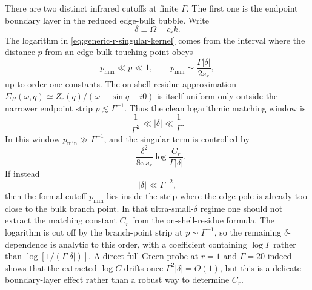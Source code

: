 \documentclass[aps,prx,preprint,amsmath,amssymb]{revtex4-2}
\begin{document}
There are two distinct infrared cutoffs at finite \(\Gamma\).  The first one is
the endpoint boundary layer in the reduced edge-bulk bubble.  Write
\[
\delta\equiv \Omega-c_r k.
\]
The logarithm in \eqref{eq:generic-r-singular-kernel} comes from the interval
where the distance \(p\) from an edge-bulk touching point obeys
\[
p_{\min}\ll p\ll1,
\qquad
p_{\min}\sim \frac{\Gamma|\delta|}{2s_r},
\]
up to order-one constants.  The on-shell residue approximation
\(\Sigma_R(\omega,q)\simeq Z_r(q)/(\omega-\sin q+i0)\) is itself uniform only
outside the narrower endpoint strip \(p\lesssim \Gamma^{-1}\).  Thus the clean
logarithmic matching window is
\begin{equation}
\label{eq:clean-endpoint-window}
\frac{1}{\Gamma^2}\ll |\delta|\ll \frac{1}{\Gamma}.
\end{equation}
In this window \(p_{\min}\gg\Gamma^{-1}\), and the singular term is controlled
by
\[
-\frac{\delta^2}{8\pi s_r}\log\frac{C_r}{\Gamma|\delta|}.
\]
If instead
\begin{equation}
\label{eq:ultrasmall-delta-window}
|\delta|\ll \Gamma^{-2},
\end{equation}
then the formal cutoff \(p_{\min}\) lies inside the strip where the edge pole is
already too close to the bulk branch point.  In that ultra-small-\(\delta\)
regime one should not extract the matching constant \(C_r\) from the
on-shell-residue formula.  The logarithm is cut off by the branch-point strip at
\(p\sim\Gamma^{-1}\), so the remaining \(\delta\)-dependence is analytic to this
order, with a coefficient containing \(\log\Gamma\) rather than
\(\log[1/(\Gamma|\delta|)]\).  A direct full-Green probe at \(r=1\) and
\(\Gamma=20\) indeed shows that the extracted \(\log C\) drifts once
\(\Gamma^2|\delta|=O(1)\), but this is a delicate boundary-layer effect rather
than a robust way to determine \(C_r\).
\end{document}
